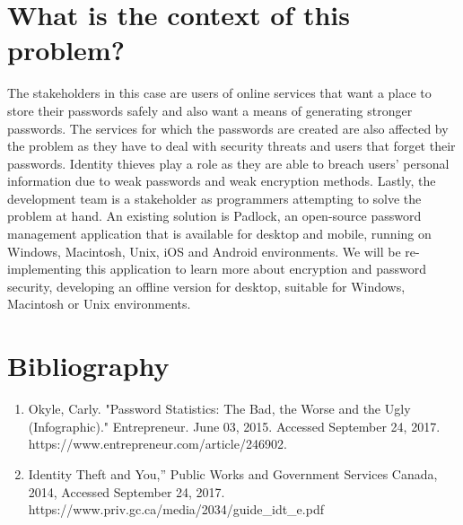 \documentclass{article}
\begin{document}
\section*{What is the context of this problem?}
The stakeholders in this case are users of online services that want a place to store their passwords safely and also want a means of generating stronger passwords. The services for which the passwords are created are also affected by the problem as they have to deal with security threats and users that forget their passwords. Identity thieves play a role as they are able to breach users’ personal information due to weak passwords and weak encryption methods. Lastly, the development team is a stakeholder as programmers attempting to solve the problem at hand. An existing solution is Padlock, an open-source password management application that is available for desktop and mobile, running on Windows, Macintosh, Unix, iOS and Android environments. We will be re-implementing this application to learn more about encryption and password security, developing an offline version for desktop, suitable for Windows, Macintosh or Unix environments. 

\section*{Bibliography}

\begin{enumerate}
    \item Okyle, Carly. "Password Statistics: The Bad, the Worse and the Ugly (Infographic)." Entrepreneur. June 03, 2015. Accessed September 24, 2017. https://www.entrepreneur.com/article/246902.
    \item Identity Theft and You,” Public Works and Government Services Canada, 2014, Accessed September 24, 2017.\\ https://www.priv.gc.ca/media/2034/guide\_idt\_e.pdf
\end{enumerate}
\end{document}
